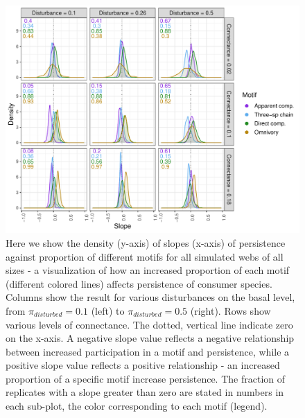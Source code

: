 \documentclass[12pt]{article}
\begin{document}
\begin{spacing}{2.0}
    \begin{figure}[h!]
    \centering
        \includegraphics[width=\textwidth]{figures/prop_dens_bp_vs_C_allS.pdf}
        \caption{Here we show the density (y-axis) of slopes (x-axis) of persistence against proportion of different motifs for all simulated webs of all sizes - a visualization of how an increased proportion of each motif (different colored lines) affects persistence of consumer species. Columns show the result for various disturbances on the basal level, from $\pi_{disturbed} = 0.1$ (left) to $\pi_{disturbed} = 0.5$ (right). Rows show various levels of connectance. The dotted, vertical line indicate zero on the x-axis. A negative slope value reflects a negative relationship between increased participation in a motif and persistence, while a positive slope value reflects a positive relationship - an increased proportion of a specific motif increase persistence. The fraction of replicates with a slope greater than zero are stated in numbers in each sub-plot, the color corresponding to each motif (legend). }
        \label{fig:density_prop_C}
    \end{figure}    
    

\end{spacing}
\end{document}
